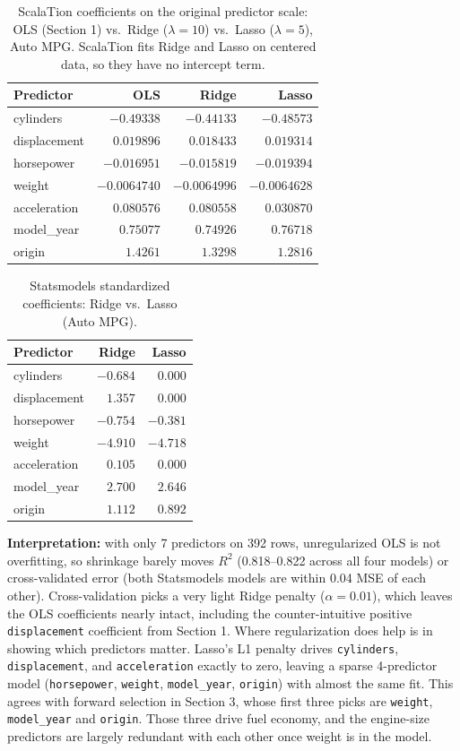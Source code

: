 \documentclass[11pt]{article}
\begin{document}
\begin{table}[H]
\centering
\caption{ScalaTion coefficients on the original predictor scale: OLS
(Section 1) vs.\ Ridge ($\lambda=10$) vs.\ Lasso ($\lambda=5$), Auto MPG.
ScalaTion fits Ridge and Lasso on centered data, so they have no intercept
term.}
\begin{tabular}{lrrr}
\toprule
Predictor & OLS & Ridge & Lasso \\
\midrule
cylinders & $-0.49338$ & $-0.44133$ & $-0.48573$ \\
displacement & $0.019896$ & $0.018433$ & $0.019314$ \\
horsepower & $-0.016951$ & $-0.015819$ & $-0.019394$ \\
weight & $-0.0064740$ & $-0.0064996$ & $-0.0064628$ \\
acceleration & $0.080576$ & $0.080558$ & $0.030870$ \\
model\_year & $0.75077$ & $0.74926$ & $0.76718$ \\
origin & $1.4261$ & $1.3298$ & $1.2816$ \\
\bottomrule
\end{tabular}
\end{table}

\begin{table}[H]
\centering
\caption{Statsmodels standardized coefficients: Ridge vs.\ Lasso (Auto MPG).}
\begin{tabular}{lrr}
\toprule
Predictor & Ridge & Lasso \\
\midrule
cylinders & $-0.684$ & $0.000$ \\
displacement & $1.357$ & $0.000$ \\
horsepower & $-0.754$ & $-0.381$ \\
weight & $-4.910$ & $-4.718$ \\
acceleration & $0.105$ & $0.000$ \\
model\_year & $2.700$ & $2.646$ \\
origin & $1.112$ & $0.892$ \\
\bottomrule
\end{tabular}
\end{table}

\textbf{Interpretation:} with only 7 predictors on 392 rows, unregularized
OLS is not overfitting, so shrinkage barely moves $R^2$ (0.818--0.822 across
all four models) or cross-validated error (both Statsmodels models are within
0.04 MSE of each other). Cross-validation picks a very light Ridge penalty
($\alpha=0.01$), which leaves the OLS coefficients nearly intact, including
the counter-intuitive positive \texttt{displacement} coefficient from
Section 1. Where regularization does help is in showing which predictors
matter. Lasso's L1 penalty drives \texttt{cylinders}, \texttt{displacement},
and \texttt{acceleration} exactly to zero, leaving a sparse 4-predictor model
(\texttt{horsepower}, \texttt{weight}, \texttt{model\_year}, \texttt{origin})
with almost the same fit. This agrees with forward selection in Section 3,
whose first three picks are \texttt{weight}, \texttt{model\_year} and
\texttt{origin}. Those three drive fuel economy, and the engine-size
predictors are largely redundant with each other once weight is in the model.
\end{document}
